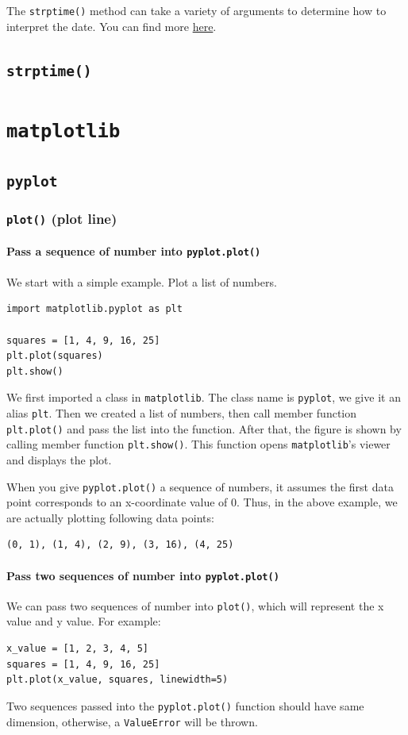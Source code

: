 \documentclass[12pt]{book}
\begin{document}
The \texttt{strptime()} method can take a variety of arguments to determine how to interpret the date. You can find more \href{https://docs.python.org/3/library/datetime.html\#strftime-and-strptime-behavior}{here}.

\section{\texttt{strptime()}}
\label{sec:org3c4bfa7}

\chapter{\texttt{matplotlib}}
\label{sec:org9269edf}
\section{\texttt{pyplot}}
\label{sec:org92a7935}
\subsection{\texttt{plot()} (plot line)}
\label{sec:org4fdddc7}
\subsubsection{Pass a sequence of number into \texttt{pyplot.plot()}}
\label{sec:orgd8ba433}
We start with a simple example. Plot a list of numbers.
\begin{verbatim}
import matplotlib.pyplot as plt

squares = [1, 4, 9, 16, 25]
plt.plot(squares)
plt.show()
\end{verbatim}
We first imported a class in \texttt{matplotlib}. The class name is \texttt{pyplot}, we give it an alias \texttt{plt}. Then we created a list of numbers, then call member function \texttt{plt.plot()} and pass the list into the function. After that, the figure is shown by calling member function \texttt{plt.show()}. This function opens \texttt{matplotlib}'s viewer and displays the plot.

When you give \texttt{pyplot.plot()} a sequence of numbers, it assumes the first data point corresponds to an x-coordinate value of 0. Thus, in the above example, we are actually plotting following data points:
\begin{verbatim}
(0, 1), (1, 4), (2, 9), (3, 16), (4, 25)
\end{verbatim}
\subsubsection{Pass two sequences of number into \texttt{pyplot.plot()}}
\label{sec:org04029bc}
We can pass two sequences of number into \texttt{plot()}, which will represent the x value and y value. For example:
\begin{verbatim}
x_value = [1, 2, 3, 4, 5]
squares = [1, 4, 9, 16, 25]
plt.plot(x_value, squares, linewidth=5)
\end{verbatim}
Two sequences passed into the \texttt{pyplot.plot()} function should have same dimension, otherwise, a \texttt{ValueError} will be thrown.
\end{document}
